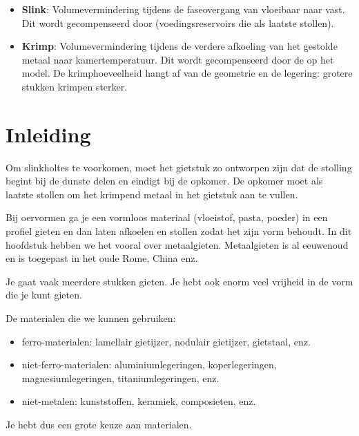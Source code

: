 \documentclass[a4paper,11pt,twoside]{report}
\begin{document}
\begin{conceptbox}
    \begin{itemize}
        \item \textbf{Slink}: Volumevermindering tijdens de faseovergang van vloeibaar naar vast. Dit wordt gecompenseerd door  (voedingsreservoirs die als laatste stollen).
        \item \textbf{Krimp}: Volumevermindering tijdens de verdere afkoeling van het gestolde metaal naar kamertemperatuur. Dit wordt gecompenseerd door de  op het model. De krimphoeveelheid hangt af van de geometrie en de legering: grotere stukken krimpen sterker.
    \end{itemize}
\end{conceptbox}

\section{Inleiding}

\begin{conceptbox}
    Om slinkholtes te voorkomen, moet het gietstuk zo ontworpen zijn dat de stolling begint bij de dunste delen en eindigt bij de opkomer.
    De opkomer moet als laatste stollen om het krimpend metaal in het gietstuk aan te vullen.
\end{conceptbox}

Bij oervormen ga je een vormloos materiaal (vloeistof, pasta, poeder) in een profiel gieten
en dan laten afkoelen en stollen zodat het zijn vorm behoudt.
In dit hoofdstuk hebben we het vooral over metaalgieten.
Metaalgieten is al eeuwenoud en is toegepast in het oude Rome, China enz.

Je gaat vaak meerdere stukken gieten.
Je hebt ook enorm veel vrijheid in de vorm die je kunt gieten.

De materialen die we kunnen gebruiken:
\begin{itemize}
    \item ferro-materialen: lamellair gietijzer, nodulair gietijzer, gietstaal, enz.
    \item niet-ferro-materialen: aluminiumlegeringen, koperlegeringen, magnesiumlegeringen, titaniumlegeringen, enz.
    \item niet-metalen: kunststoffen, keramiek, composieten, enz.
\end{itemize}

Je hebt dus een grote keuze aan materialen.
\end{document}
